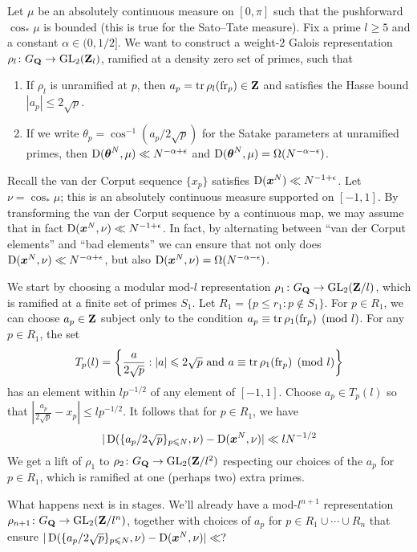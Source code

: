 Let $\mu$ be an absolutely continuous measure on $[0,\pi]$ such that the 
pushforward $\cos_\ast \mu$ is bounded (this is true for the Sato--Tate 
measure). Fix a prime $l\geqslant 5$ and a constant $\alpha\in (0,1/2]$. We 
want to construct a weight-$2$ Galois representation 
$\rho_l\colon G_{\mathbf{Q}} \to \operatorname{GL}_2(\mathbf{Z}_l)$, ramified at a density zero set of 
primes, such that 
\begin{enumerate}
\item
If $\rho_l$ is unramified at $p$, then $a_p = \operatorname{tr} \rho_l(\mathrm{fr}_p)\in \mathbf{Z}$ and 
satisfies the Hasse bound $|a_p| \leqslant 2\sqrt p$. 

\item
If we write $\theta_p = \cos^{-1}(a_p / 2\sqrt p)$ for the Satake parameters at 
unramified primes, then $\operatorname{D}({\boldsymbol\theta}^N, \mu) \ll N^{-\alpha+\epsilon}$ and 
$\operatorname{D}({\boldsymbol\theta}^N,\mu) = \Omega(N^{-\alpha-\epsilon})$. 
\end{enumerate}

Recall the van der Corput sequence $\{x_p\}$ satisfies 
$\operatorname{D}({\boldsymbol x}^N) \ll N^{-1+\epsilon}$. Let $\nu = \cos_\ast \mu$; this is an 
absolutely continuous measure supported on $[-1,1]$. By transforming the 
van der Corput sequence by a continuous map, we may assume that in fact 
$\operatorname{D}({\boldsymbol x}^N,\nu) \ll N^{-1+\epsilon}$. In fact, by alternating between 
``van der Corput elements'' and ``bad elements'' we can ensure that not 
only does $\operatorname{D}({\boldsymbol x}^N,\nu) \ll N^{-\alpha+\epsilon}$, but also 
$\operatorname{D}({\boldsymbol x}^N,\nu) = \Omega(N^{-\alpha-\epsilon})$. 

We start by choosing a modular mod-$l$ representation 
$\rho_1\colon G_{\mathbf{Q}} \to \operatorname{GL}_2(\mathbf{Z}/l)$, which is ramified at a finite set of 
primes $S_1$. Let $R_1 = \{p\leqslant r_1 : p \notin S_1\}$. For $p\in R_1$, 
we can choose $a_p\in \mathbf{Z}$ subject only to the condition 
$a_p \equiv \operatorname{tr} \rho_1(\mathrm{fr}_p)\pmod l$. For any $p\in R_1$, the set 
\[
	T_p(l) = \left\{\frac{a}{2\sqrt p} : |a| \leqslant 2\sqrt p\text{ and }a\equiv \operatorname{tr} \rho_1(\mathrm{fr}_p)\pmod l\right\}
\]
has an element within $l p^{-1/2}$ of any element of $[-1,1]$. Choose 
$a_p\in T_p(l)$ so that 
$\left|\frac{a_p}{2\sqrt p} - x_p\right| \leqslant l p^{-1/2}$. It follows 
that for $p\in R_1$, we have 
\[
	|\operatorname{D}(\{a_p/2\sqrt p\}_{p\leqslant N}, \nu) - \operatorname{D}({\boldsymbol x}^N,\nu)| \ll l N^{-1/2}
\]
We get a lift of $\rho_1$ to $\rho_2\colon G_{\mathbf{Q}} \to \operatorname{GL}_2(\mathbf{Z}/l^2)$ respecting 
our choices of the $a_p$ for $p\in R_1$, which is ramified at one (perhaps two) 
extra primes. 


What happens next is in stages. We'll already have a mod-$l^{n+1}$ 
representation $\rho_{n+1}\colon G_{\mathbf{Q}} \to \operatorname{GL}_2(\mathbf{Z}/l^n)$, together with 
choices of $a_p$ for $p\in R_1\cup \cdots \cup R_n$ that ensure 
$|\operatorname{D}(\{a_p / 2\sqrt p\}_{p\leqslant N}, \nu) - \operatorname{D}({\boldsymbol x}^N,\nu)| \ll ?$


